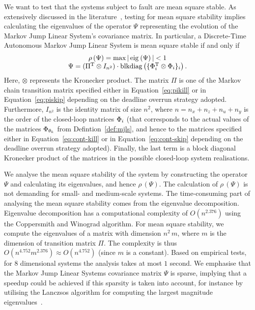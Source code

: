 We want to test that the systems subject to fault are mean square stable.
As extensively discussed in the literature~\cite{Costa:2005}, testing for mean square stability implies calculating the eigenvalues of the operator $\Psi$ representing the evolution of the Markov Jump Linear System's covariance matrix.
In particular, a Discrete-Time Autonomous Markov Jump Linear System is mean square stable if and only if 
\begin{equation}%
    \label{eq:stab-notion}%
    \begin{matrix}
        \rho\,(\Psi) = \max{\abs{\,\eig{}{\Psi}\,}} < 1 \\
        \Psi = (\Pi^\T \otimes I_{n^2}) \cdot \blkdiag{\{ \clmat_{i}^\T \otimes \clmat_{i} \}_{i}}.
    \end{matrix}
\end{equation}
Here, $\otimes$ represents the Kronecker product.
The matrix $\Pi$ is one of the Markov chain transition matrix specified either in Equation~\eqref{eq:pikill} or in Equation~\eqref{eq:piskip} depending on the deadline overrun strategy adopted.
Furthermore, $I_{n^2}$ is the identity matrix of size $n^2$, where $n = n_x + n_z + n_u + n_y$ is the order of the closed-loop matrices $\Phi_{i}$ (that corresponds to the actual values of the matrices $\Phi_{\theta_k}$ from Defintion~\ref{def:mjls}, and hence to the matrices specified either in Equation~\eqref{eq:cont-kill} or in Equation~\eqref{eq:cont-skip} depending on the deadline overrun strategy adopted).
Finally, the last term is a block diagonal Kronecker product of the matrices in the possible closed-loop system realisations.

We analyse the mean square stability of the system by constructing the operator $\Psi$ and calculating its eigenvalues, and hence $\rho\,(\Psi)$.
The calculation of $\rho\,(\Psi)$ is not demanding for small- and medium-scale systems.
The time-consuming part of analysing the mean square stability comes from the eigenvalue decomposition.
Eigenvalue decomposition has a computational complexity of 
$O(n^{2.376})$ using the Coppersmith and Winograd algorithm.
For mean square stability, we compute the eigenvalues of a matrix with dimension $n^2\,m$, where $m$ is the dimension of transition matrix $\Pi$.
The complexity is thus $O(n^{4.752}m^{2.376}) \approx O(n^{4.752})$ (since $m$ is a constant).
Based on empirical tests, for $8$ dimensional systems the analysis takes at most $1$ second.
We emphasise that the Markov Jump Linear Systems covariance matrix $\Psi$ is sparse, implying that a speedup could be achieved if this sparsity is taken into account, for instance by utilising the Lanczsos algorithm for computing the largest magnitude eigenvalues~\cite{Golub:1996}.
